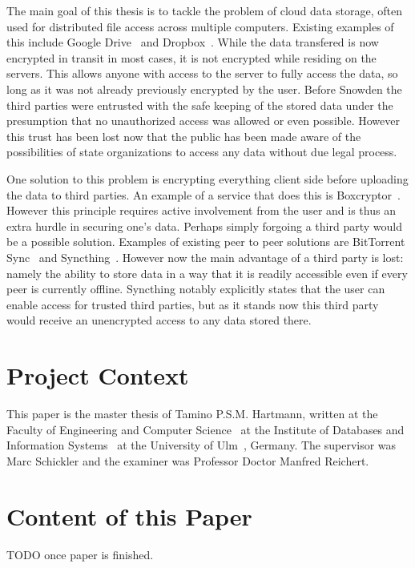 The main goal of this thesis is to tackle the problem of cloud data storage, often used for distributed file access across multiple computers.
Existing examples of this include Google Drive~\cite{web:site:gdrive} and Dropbox~\cite{web:site:dropbox}.
While the data transfered is now encrypted in transit in most cases, it is not encrypted while residing on the servers.
This allows anyone with access to the server to fully access the data, so long as it was not already previously encrypted by the user.
Before Snowden the third parties were entrusted with the safe keeping of the stored data under the presumption that no unauthorized access was allowed or even possible.
However this trust has been lost now that the public has been made aware of the possibilities of state organizations to access any data without due legal process.

One solution to this problem is encrypting everything client side before uploading the data to third parties.
An example of a service that does this is Boxcryptor~\cite{web:site:boxcryptor}.
However this principle requires active involvement from the user and is thus an extra hurdle in securing one's data.
Perhaps simply forgoing a third party would be a possible solution.
Examples of existing peer to peer solutions are BitTorrent Sync~\cite{web:site:bittorrent_sync} and Syncthing~\cite{web:site:synthing}.
However now the main advantage of a third party is lost: namely the ability to store data in a way that it is readily accessible even if every peer is currently offline.
Syncthing notably explicitly states that the user can enable access for trusted third parties, but as it stands now this third party would receive an unencrypted access to any data stored there.

\section{Project Context}

This paper is the master thesis of Tamino P.S.M. Hartmann, written at the Faculty of Engineering and Computer Science~\cite{web:site:faculty} at the Institute of Databases and Information Systems~\cite{web:site:institute} at the University of Ulm~\cite{web:site:uni_ulm}, Germany.
The supervisor was Marc Schickler and the examiner was Professor Doctor Manfred Reichert.

\section{Content of this Paper}

TODO once paper is finished.
